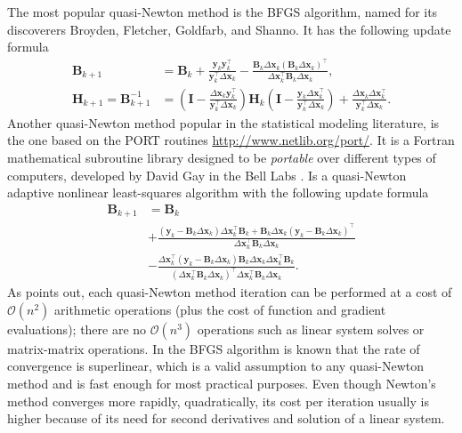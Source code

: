 The most popular quasi-Newton method is the BFGS algorithm, named for
its discoverers Broyden, Fletcher, Goldfarb, and Shanno. It has the
following update formula
\begin{align*}
 \bm{B}_{k+1} &= \bm{B}_{k} +
                \frac{\bm{y}_{k}\bm{y}_{k}^{\top}}{
                      \bm{y}_{k}^{\top}\Delta\bm{x}_{k}} -
                \frac{\bm{B}_{k}\Delta\bm{x}_{k}
                     (\bm{B}_{k}\Delta\bm{x}_{k})^{\top}}{
                      \Delta\bm{x}_{k}^{\top}\bm{B}_{k}
                      \Delta\bm{x}_{k}},\\
 \bm{H}_{k+1} = \bm{B}_{k+1}^{-1}
            &= \left(\bm{I} -
                     \frac{\Delta\bm{x}_{k}\bm{y}_{k}^{\top}}{
                           \bm{y}_{k}^{\top}\Delta\bm{x}_{k}}
                \right) \bm{H}_{k}
                \left(\bm{I} -
                      \frac{\bm{y}_{k}\Delta\bm{x}_{k}^{\top}}{
                            \bm{y}_{k}^{\top}\Delta\bm{x}_{k}}
                \right) + \frac{\Delta\bm{x}_{k}
                                \Delta\bm{x}_{k}^{\top}}{
                                \bm{y}_{k}^{\top}\Delta\bm{x}_{k}}.
\end{align*}
Another quasi-Newton method popular in the statistical modeling
literature, is the one based on the PORT routines
\url{http://www.netlib.org/port/}. It is a Fortran mathematical
subroutine library designed to be \textit{portable} over different types
of computers, developed by David Gay in the Bell Labs \cite{PORTreport}.
Is a quasi-Newton adaptive nonlinear least-squares algorithm
\cite{PORTpaper} with the following update formula
\begin{align*}
 \bm{B}_{k+1} &= \bm{B}_{k}\\
             &+ \frac{
                 \left(\bm{y}_{k} - \bm{B}_{k}\Delta\bm{x}_{k}\right)
                 \Delta\bm{x}_{k}^{\top}\bm{B}_{k} +
                 \bm{B}_{k}\Delta\bm{x}_{k}
                 \left(\bm{y}_{k} - \bm{B}_{k}\Delta\bm{x}_{k}
                 \right)^{\top}}{
                 \Delta\bm{x}_{k}^{\top}\bm{B}_{k}\Delta\bm{x}_{k}}\\
             &- \frac{
                 \Delta\bm{x}_{k}^{\top}
                 \left(\bm{y}_{k} - \bm{B}_{k}\Delta\bm{x}_{k}\right)
                 \bm{B}_{k}\Delta\bm{x}_{k}
                 \Delta\bm{x}_{k}^{\top}\bm{B}_{k}}{
                 \left(\Delta\bm{x}_{k}^{\top}\bm{B}_{k}\Delta\bm{x}_{k}
                 \right)^{\top}
                 \Delta\bm{x}_{k}^{\top}\bm{B}_{k}\Delta\bm{x}_{k}}.
\end{align*}
As  points out, each quasi-Newton method
iteration can be performed at a cost of \(\mathcal{O}(n^{2})\)
arithmetic operations (plus the cost of function and gradient
evaluations); there are no \(\mathcal{O}(n^{3})\) operations such as
linear system solves or matrix-matrix operations. In the BFGS algorithm
is known that the rate of convergence is superlinear, which is a valid
assumption to any quasi-Newton method and is fast enough for most
practical purposes. Even though Newton's method converges more rapidly,
quadratically, its cost per iteration usually is higher because of its
need for second derivatives and solution of a linear system.

